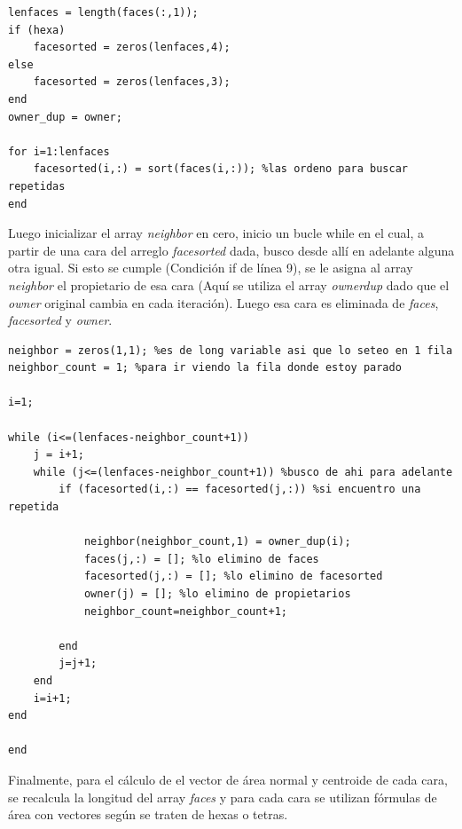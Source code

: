 \documentclass[11pt]{article}
\begin{document}
\bigskip
\lstset{language=Matlab, breaklines=true, basicstyle=\footnotesize}
\begin{lstlisting}[frame=single]
lenfaces = length(faces(:,1));
if (hexa)
    facesorted = zeros(lenfaces,4);
else
    facesorted = zeros(lenfaces,3);
end
owner_dup = owner;

for i=1:lenfaces
    facesorted(i,:) = sort(faces(i,:)); %las ordeno para buscar repetidas
end
\end{lstlisting}
\bigskip

\bigskip Luego inicializar el array \textit{neighbor} en cero, inicio un bucle while en el cual, a partir de una cara del arreglo \textit{facesorted} dada, busco desde all\'i en adelante alguna otra igual. Si esto se cumple (Condici\'on if de l\'inea 9), se le asigna al array \textit{neighbor} el propietario de esa cara (Aqu\'i se utiliza el array \textit{ownerdup} dado que el \textit{owner} original cambia en cada iteraci\'on). Luego esa cara es eliminada de \textit{faces}, \textit{facesorted} y \textit{owner}. 

\bigskip
\lstset{language=Matlab, breaklines=true, basicstyle=\footnotesize}
\begin{lstlisting}[frame=single]
neighbor = zeros(1,1); %es de long variable asi que lo seteo en 1 fila
neighbor_count = 1; %para ir viendo la fila donde estoy parado

i=1;

while (i<=(lenfaces-neighbor_count+1))
    j = i+1;
    while (j<=(lenfaces-neighbor_count+1)) %busco de ahi para adelante
        if (facesorted(i,:) == facesorted(j,:)) %si encuentro una repetida
            
            neighbor(neighbor_count,1) = owner_dup(i);
            faces(j,:) = []; %lo elimino de faces
            facesorted(j,:) = []; %lo elimino de facesorted
            owner(j) = []; %lo elimino de propietarios
            neighbor_count=neighbor_count+1;
            
        end
        j=j+1;
    end
    i=i+1;
end

end
\end{lstlisting}
\bigskip

Finalmente, para el c\'alculo de el vector de \'area normal y centroide de cada cara, se recalcula la longitud del array \textit{faces} y para cada cara se utilizan f\'ormulas de \'area con vectores seg\'un se traten de hexas o tetras.
\end{document}
